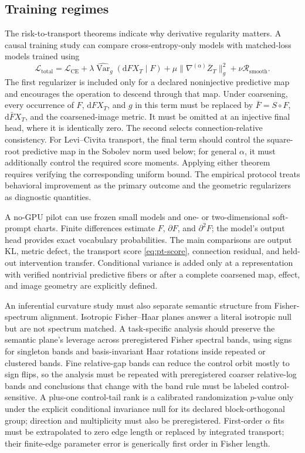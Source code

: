 \documentclass[11pt]{article}
\theoremstyle{definition}
\theoremstyle{remark}
\newcommand{\Var}{\operatorname{Var}}
\newcommand{\dd}{\mathrm{d}}
\begin{document}
\subsection{Training regimes}

The risk-to-transport theorems indicate why derivative regularity matters. A causal training study can compare cross-entropy-only models with matched-loss models trained using
\begin{equation}
    \mathcal L_{\mathrm{total}}
    =\mathcal L_{\mathrm{CE}}
    +\lambda\widehat{\Var}_g(\dd F X_T\mid F)
    +\mu\|\nabla^{(\alpha)}\overline Z_T\|_g^2
    +\nu\mathcal R_{\mathrm{smooth}}.
    \label{eq:training-objective}
\end{equation}
The first regularizer is included only for a declared noninjective predictive map and encourages the operation to descend through that map. Under coarsening, every occurrence of $F$, $\dd F X_T$, and $g$ in this term must be replaced by $\bar F=S\circ F$, $\dd\bar F X_T$, and the coarsened-image metric. It must be omitted at an injective final head, where it is identically zero. The second selects connection-relative consistency. For Levi--Civita transport, the final term should control the square-root predictive map in the Sobolev norm used below; for general $\alpha$, it must additionally control the required score moments. Applying either theorem requires verifying the corresponding uniform bound. The empirical protocol treats behavioral improvement as the primary outcome and the geometric regularizers as diagnostic quantities.

A no-GPU pilot can use frozen small models and one- or two-dimensional soft-prompt charts. Finite differences estimate $F$, $\partial F$, and $\partial^2F$; the model's output head provides exact vocabulary probabilities. The main comparisons are output KL, metric defect, the transport score \eqref{eq:pt-score}, connection residual, and held-out intervention transfer. Conditional variance is added only at a representation with verified nontrivial predictive fibers or after a complete coarsened map, effect, and image geometry are explicitly defined.

An inferential curvature study must also separate semantic structure from Fisher-spectrum alignment. Isotropic Fisher--Haar planes answer a literal isotropic null but are not spectrum matched. A task-specific analysis should preserve the semantic plane's leverage across preregistered Fisher spectral bands, using signs for singleton bands and basis-invariant Haar rotations inside repeated or clustered bands. Fine relative-gap bands can reduce the control orbit mostly to sign flips, so the analysis must be repeated with preregistered coarser relative-log bands and conclusions that change with the band rule must be labeled control-sensitive. A plus-one control-tail rank is a calibrated randomization $p$-value only under the explicit conditional invariance null for its declared block-orthogonal group; direction and multiplicity must also be preregistered. First-order $\alpha$ fits must be extrapolated to zero edge length or replaced by integrated transport; their finite-edge parameter error is generically first order in Fisher length.
\end{document}
